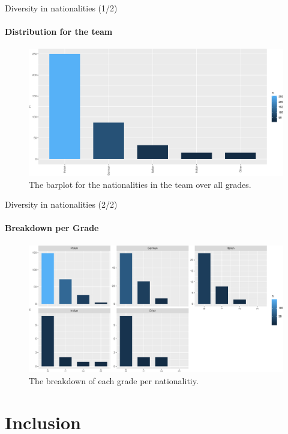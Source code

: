 \documentclass[
  ignorenonframetext,
  usenames,
  dvipsnames]{beamer}
\begin{document}
\begin{frame}{Diversity in nationalities (1/2)}
\protect\hypertarget{diversity-in-nationalities-12}{}
\framesubtitle{Distribution for the team}

\begin{figure}
\centering
\includegraphics{team_slides_files/figure-beamer/nationalities-1.pdf}
\caption{The barplot for the nationalities in the team over all grades.}
\end{figure}
\end{frame}

\begin{frame}{Diversity in nationalities (2/2)}
\protect\hypertarget{diversity-in-nationalities-22}{}
\framesubtitle{Breakdown per Grade}

\begin{figure}
\centering
\includegraphics{team_slides_files/figure-beamer/nationalities2-1.pdf}
\caption{The breakdown of each grade per nationalitiy.}
\end{figure}
\end{frame}

\hypertarget{inclusion}{%
\section{Inclusion}\label{inclusion}}
\end{document}
